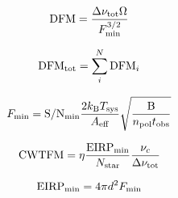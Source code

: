\begin{equation}
{\rm DFM} = \frac{\Delta \nu_{\rm tot} \Omega}{F_{\rm min}^{3/2}}
\end{equation}

\begin{equation}
{\rm DFM_{\rm tot}} = \sum_{i}^{N} {\rm DFM}_{i}
\end{equation}

\begin{equation}
F_{\rm min} = {\rm S/N_{min}} \frac{2 k_{\rm B} T_{\rm sys}}{A_{\rm eff}} \sqrt{\frac{\rm B}{n_{\rm pol} t_{\rm obs}}}
\end{equation}

\begin{equation}
{\rm CWTFM} = \eta \frac{\rm EIRP_{min}}{N_{\rm star}} \frac{\nu_{c}}{\Delta \nu_{\rm tot}}
\end{equation}

\begin{equation}
{\rm EIRP_{min}} = 4 \pi d^2 F_{\rm min}
\end{equation}
